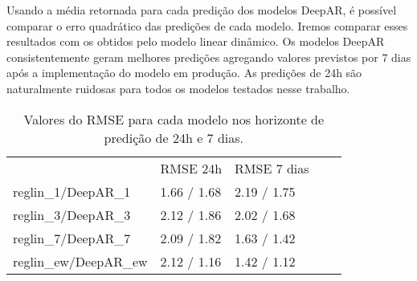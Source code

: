 Usando a média retornada para cada predição dos modelos DeepAR, é possível
comparar o erro quadrático das predições de cada modelo. Iremos comparar esses resultados com os obtidos pelo modelo
linear dinâmico. Os modelos DeepAR consistentemente geram melhores predições agregando valores previstos por 7 dias
após a implementação do modelo em produção. As predições de 24h são naturalmente
ruidosas para todos os modelos testados nesse trabalho.

\begin{center}
\begin{table}[]
  \centering
  \begin{tabular}{l|llll}
    \cline{2-3}
    & \multicolumn{1}{l|}{RMSE 24h} & \multicolumn{1}{l|}{RMSE 7 dias} &  \\ \cline{1-3}
    \multicolumn{1}{|l|}{reglin\_1/DeepAR\_1} & 1.66 / 1.68                   & 2.19 / 1.75                      &  \\ \cline{1-1}
    \multicolumn{1}{|l|}{reglin\_3/DeepAR\_3} & 2.12 / 1.86                   & 2.02 / 1.68                      &  \\ \cline{1-1}
    \multicolumn{1}{|l|}{reglin\_7/DeepAR\_7} & 2.09 / 1.82                   & 1.63 / 1.42                      &  \\ \cline{1-1}
    \multicolumn{1}{|l|}{reglin\_ew/DeepAR\_ew} & 2.12 / 1.16                   & 1.42 / 1.12                      &  \\ \cline{1-1}
  \end{tabular}
  \caption{Valores do RMSE para cada modelo nos horizonte de predição de 24h e 7 dias.}
\label{tb:rmsedeepar}
\end{table}
\end{center}